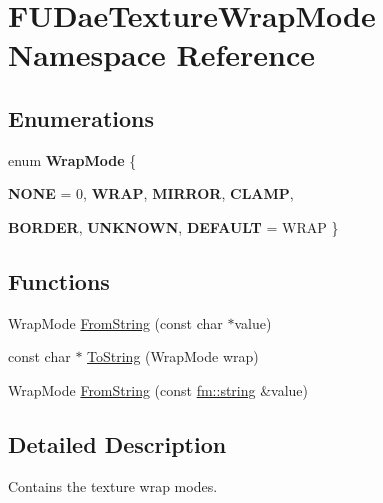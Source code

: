 \hypertarget{namespaceFUDaeTextureWrapMode}{
\section{FUDaeTextureWrapMode Namespace Reference}
\label{namespaceFUDaeTextureWrapMode}
}
\subsection*{Enumerations}
\begin{DoxyCompactItemize}
\item 
enum {\bfseries WrapMode} \{ \par
{\bfseries NONE} =  0, 
{\bfseries WRAP}, 
{\bfseries MIRROR}, 
{\bfseries CLAMP}, 
\par
{\bfseries BORDER}, 
{\bfseries UNKNOWN}, 
{\bfseries DEFAULT} =  WRAP
 \}
\end{DoxyCompactItemize}
\subsection*{Functions}
\begin{DoxyCompactItemize}
\item 
WrapMode \hyperlink{namespaceFUDaeTextureWrapMode_a4dc33274a3c61ac699e126d9d47ac263}{FromString} (const char $\ast$value)
\item 
const char $\ast$ \hyperlink{namespaceFUDaeTextureWrapMode_a6813360a859adb0112a79aa75b9c2f7a}{ToString} (WrapMode wrap)
\item 
WrapMode \hyperlink{namespaceFUDaeTextureWrapMode_a408e6694f7139f62d9cc6c9ee33fc0ac}{FromString} (const \hyperlink{classfm_1_1stringT}{fm::string} \&value)
\end{DoxyCompactItemize}


\subsection{Detailed Description}
Contains the texture wrap modes. 

